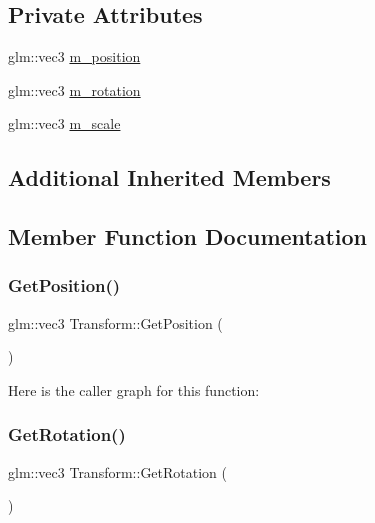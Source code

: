 \subsection*{Private Attributes}
\begin{DoxyCompactItemize}
\item 
glm\+::vec3 \mbox{\hyperlink{class_disc___engine_1_1_transform_a1257c40bded20d52e76e3e5388fc2acb}{m\+\_\+position}}
\item 
glm\+::vec3 \mbox{\hyperlink{class_disc___engine_1_1_transform_a1775383b5dd8c6339a976c0686fbbf7c}{m\+\_\+rotation}}
\item 
glm\+::vec3 \mbox{\hyperlink{class_disc___engine_1_1_transform_af75d66027ab30e4fb6e0b3ee4a2bda4a}{m\+\_\+scale}}
\end{DoxyCompactItemize}
\subsection*{Additional Inherited Members}


\subsection{Member Function Documentation}
\mbox{\label{class_disc___engine_1_1_transform_ab56d0806d3d2d67a0587c7ffebf0b2d0}} 
\subsubsection{\texorpdfstring{Get\+Position()}{GetPosition()}}
{\footnotesize\ttfamily glm\+::vec3 Transform\+::\+Get\+Position (\begin{DoxyParamCaption}{ }\end{DoxyParamCaption})}

Here is the caller graph for this function\+:
\mbox{\label{class_disc___engine_1_1_transform_a5af4d340711239a3517813e9122c6065}} 
\subsubsection{\texorpdfstring{Get\+Rotation()}{GetRotation()}}
{\footnotesize\ttfamily glm\+::vec3 Transform\+::\+Get\+Rotation (\begin{DoxyParamCaption}{ }\end{DoxyParamCaption})}

